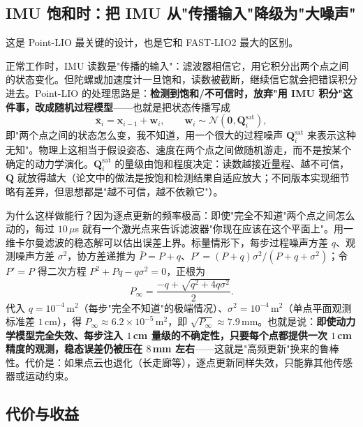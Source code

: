 \subsection{IMU 饱和时：把 IMU 从"传播输入"降级为"大噪声"}

这是 Point-LIO 最关键的设计，也是它和 FAST-LIO2 最大的区别。

正常工作时，IMU 读数是"传播的输入"：滤波器相信它，用它积分出两个点之间的状态变化。但陀螺或加速度计一旦饱和，读数被截断，继续信它就会把错误积分进去。Point-LIO 的处理思路是：\textbf{检测到饱和/不可信时，放弃"用 IMU 积分"这件事，改成随机过程模型}——也就是把状态传播写成
\begin{equation}\label{eq:17-random-walk}
  \bar{\bm{x}}_i=\bm{x}_{i-1}+\bm{w}_i,\qquad \bm{w}_i\sim\mathcal{N}(\bm{0},\bm{Q}_i^{\mathrm{sat}}),
\end{equation}
即"两个点之间的状态怎么变，我不知道，用一个很大的过程噪声 $\bm{Q}_i^{\mathrm{sat}}$ 来表示这种无知"。物理上这相当于假设姿态、速度在两个点之间做随机游走，而不是按某个确定的动力学演化。$\bm{Q}_i^{\mathrm{sat}}$ 的量级由饱和程度决定：读数越接近量程、越不可信，$\bm{Q}$ 就放得越大（论文中的做法是按饱和检测结果自适应放大；不同版本实现细节略有差异，但思想都是"越不可信，越不依赖它"）。

为什么这样做能行？因为逐点更新的频率极高：即使"完全不知道"两个点之间怎么动的，每过 $10\,\mu$s 就有一个激光点来告诉滤波器"你现在应该在这个平面上"。用一维卡尔曼滤波的稳态解可以估出误差上界。标量情形下，每步过程噪声方差 $q$、观测噪声方差 $\sigma^2$，协方差递推为 $\bar{P}=P+q$、$P'=(P+q)\sigma^2/(P+q+\sigma^2)$；令 $P'=P$ 得二次方程 $P^2+Pq-q\sigma^2=0$，正根为
\begin{equation}\label{eq:17-riccati}
  P_\infty=\frac{-q+\sqrt{q^2+4q\sigma^2}}{2}.
\end{equation}
代入 $q=10^{-4}\,\mathrm{m^2}$（每步"完全不知道"的极端情况）、$\sigma^2=10^{-4}\,\mathrm{m^2}$（单点平面观测标准差 $1$\,cm），得 $P_\infty\approx6.2\times10^{-5}\,\mathrm{m^2}$，即 $\sqrt{P_\infty}\approx7.9$\,mm。也就是说：\textbf{即使动力学模型完全失效、每步注入 $1$\,cm 量级的不确定性，只要每个点都提供一次 $1$\,cm 精度的观测，稳态误差仍被压在 $8$\,mm 左右}——这就是"高频更新"换来的鲁棒性。代价是：如果点云也退化（长走廊等），逐点更新同样失效，只能靠其他传感器或运动约束。

\subsection{代价与收益}

